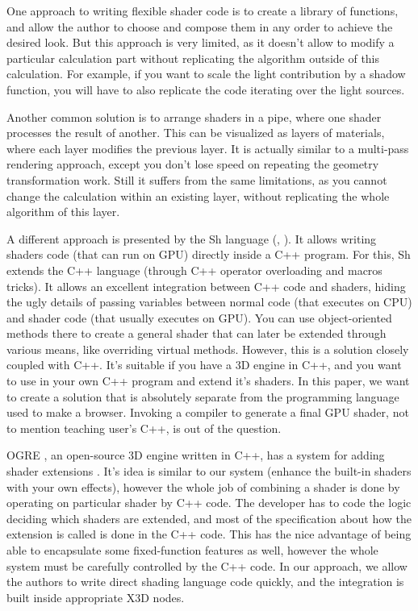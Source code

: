 \documentclass{acmsiggraph}                     %
\begin{document}
One approach to writing flexible shader code is to create
a library of functions, and allow the author to choose and compose them
in any order to achieve the desired look. But this approach is very limited,
as it doesn't allow to modify a particular calculation part without
replicating the algorithm outside of this calculation.
For example, if you want to scale the light contribution by a shadow function,
you will have to also replicate the code iterating over the light sources.

Another common solution is to arrange shaders in a pipe, where one
shader processes the result of another. This can be visualized as
layers of materials, where each layer modifies the previous
layer. It is actually similar to a multi-pass rendering approach,
except you don't lose speed on repeating the geometry transformation work.
Still it suffers from the same limitations, as you cannot change
the calculation within an existing layer, without replicating the whole
algorithm of this layer.


A different approach is presented by the Sh language (\cite{sh}, \cite{sh:book}).
It allows writing shaders code (that can run on GPU) directly inside a
C++ program. For this, Sh extends the C++ language (through C++
operator overloading and macros tricks). It allows an excellent
integration between C++ code and shaders, hiding the ugly details of
passing variables between normal code (that executes on CPU) and
shader code (that usually executes on GPU). You can use
object-oriented methods there to create a general shader that can
later be extended through various means, like overriding virtual
methods. However, this is a solution closely coupled with C++. It's
suitable if you have a 3D engine in C++, and you want to use in your
own C++ program and extend it's shaders. In this paper, we want to
create a solution that is absolutely separate from the programming
language used to make a browser. Invoking a compiler to generate a
final GPU shader, not to mention teaching user's C++, is out of the
question.

OGRE \cite{ogre}, an open-source 3D engine written in C++, has a system
for adding shader extensions \cite{ogre:shader}. It's idea is similar
to our system (enhance the built-in shaders with your own effects),
however the whole job of combining a shader is done by operating
on particular shader by C++ code. The developer has to code
the logic deciding which shaders are extended, and most of the specification
about how the extension is called is done in the C++ code.
This has the nice advantage of being able to encapsulate some fixed-function
features as well, however the whole system must be carefully controlled by
the C++ code. In our approach, we allow the authors to write direct shading
language code quickly, and the integration is built inside appropriate X3D nodes.
\end{document}
